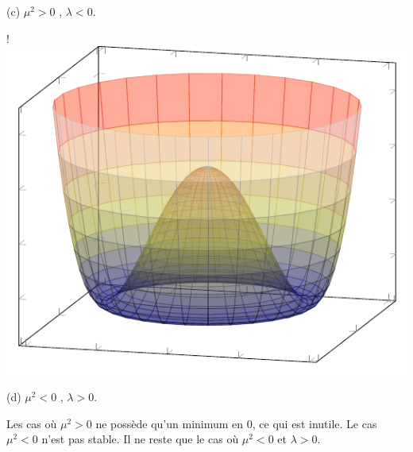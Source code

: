 {{}
\begin{center}\normalfont\small {(c) $\mu^{2}>0$ , $\lambda<0$.}\end{center}
\resizebox {\marginparwidth} {!} 
{
	\includegraphics[scale=1]{SM/mp.pdf}
}
\begin{center}\normalfont\small {(d) $\mu^{2}<0$ , $\lambda>0$.}\end{center}
\label{profile}
}
Les cas où $\mu^{2}>0$ ne possède qu'un minimum en $0$, ce qui est inutile. Le cas $\mu^{2}<0$ n'est pas stable. Il ne reste que le cas où $\mu^{2}<0$ et $\lambda>0$.

